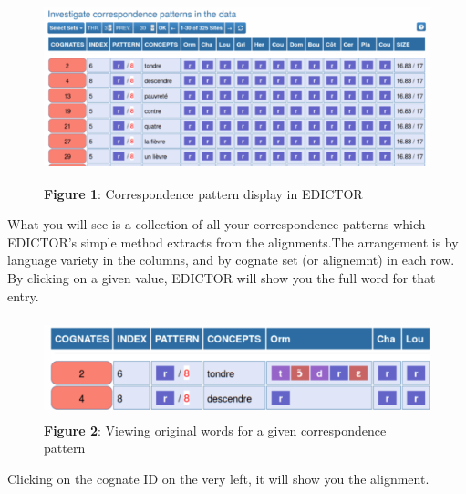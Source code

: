 \documentclass[
  a4paper,
  14pt,
  oneside,
  tablecaptionabove
]{scrbook}
\begin{document}
\begin{figure}[h!]
\centering
\includegraphics[width=5.20833in,height=2.14583in]{images/__f-origin.hypotheses.org_wp-content_blogs.dir_4500_files_2019_02_edictor1-500x206.png}
\captionsetup{labelformat=empty}
\caption{\textbf{Figure 1}: Correspondence pattern display in EDICTOR}
\end{figure}


What you will see is a collection of all your correspondence patterns
which EDICTOR's simple method extracts from the alignments.The
arrangement is by language variety in the columns, and by cognate set
(or alignemnt) in each row. By clicking on a given value, EDICTOR will
show you the full word for that entry.

\begin{figure}[h!]
\centering
\includegraphics[width=5.20833in,height=1.13542in]{images/__f-origin.hypotheses.org_wp-content_blogs.dir_4500_files_2019_02_edictor2-500x109.png}
\captionsetup{labelformat=empty}
\caption{\textbf{Figure 2}: Viewing original words for a given correspondence pattern}
\end{figure}


Clicking on the cognate ID on the very left, it will show you the
alignment.
\end{document}
